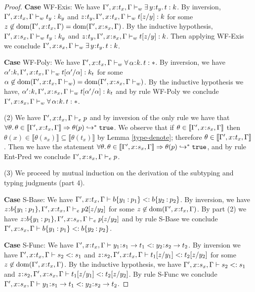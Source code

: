 \documentclass[11pt]{article}
\newcommand{\al}{\alpha}
\newcommand{\bind}{\hspace{0.05em}{:}\hspace{0.05em}} %
\newcommand{\col}{\mathbin{:}}       %
\newcommand{\lb}{\llbracket}         %
\newcommand{\rb}{\rrbracket}         %
\newcommand{\many}{\hookrightarrow^*}
\newcommand{\true}{\mathtt{true}}
\newcommand{\existype}[3]{\exists\, #1\bind #2.\, #3}
\newcommand{\polytype}[3]{\forall\, #1\bind #2.\, #3}
\newcommand{\functype}[3]{#1\bind #2 \rightarrow #3}
\newcommand{\dom}[1]{{\rm dom}(#1)}
\begin{document}
\begin{proof}
{\bf Case} {\sc WF-Exis}: We have $\Gamma', x\bind t_x, \Gamma \vdash_w \existype{y}{t_y}{t} : k$. By inversion, $\Gamma', x\bind t_x, \Gamma \vdash_w t_y : k_y$ and $z\bind t_y, \Gamma', x\bind t_x, \Gamma \vdash_w t[z/y] : k$ for some $z\not\in\dom{\Gamma', x\bind t_x, \Gamma} = \dom{\Gamma', x\bind s_x, \Gamma}$. By the inductive hypothesis, $\Gamma', x\bind s_x, \Gamma \vdash_w t_y : k_y$ and $z\bind t_y, \Gamma', x\bind s_x, \Gamma \vdash_w t[z/y] : k$. Then applying {\sc WF-Exis} we conclude $\Gamma', x\bind s_x, \Gamma \vdash_w \existype{y}{t_y}{t} : k$.

{\bf Case} {\sc WF-Poly}: We have $\Gamma', x\bind t_x, \Gamma \vdash_w \polytype{\al}{k}{t} : *$. By inversion, we have $\al'\bind k,\Gamma', x\bind t_x, \Gamma \vdash_w t[\al'/\al] : k_t$ for some $\al\not\in\dom{\Gamma', x\bind t_x, \Gamma \vdash_w} = \dom{\Gamma', x\bind s_x, \Gamma \vdash_w}$. By the inductive hypothesis we have, $\al'\bind k,\Gamma', x\bind s_x, \Gamma \vdash_wt[\al'/\al] : k_t$ and by rule {\sc WF-Poly} we conclude $\Gamma', x\bind s_x, \Gamma \vdash_w \polytype{\al}{k}{t} : *$.

(2) We have $\Gamma', x\bind t_x, \Gamma \vdash_e p$ and by inversion of the only rule we have that $\forall \theta.\,\theta\in \lb\Gamma', x\bind t_x, \Gamma \rb \Rightarrow  \theta(p) \many \true$. We observe that if $\theta \in \lb\Gamma', x\bind s_x, \Gamma \rb$ then $\theta(x) \in \lb\theta(s_x)\rb \subseteq \lb\theta(t_x)\rb$ by Lemma \ref{type-denote}; therefore $\theta \in \lb\Gamma', x\bind t_x, \Gamma \rb$. Then we have the statement $\forall \theta.\,\theta\in \lb\Gamma', x\bind s_x, \Gamma \rb \Rightarrow  \theta(p) \many \true$, and by rule {\sc Ent-Pred} we conclude $\Gamma', x\bind s_x, \Gamma \vdash_e p$.

(3) We proceed by mutual induction on the derivation of the subtyping and typing judgments (part 4).

{\bf Case} {\sc S-Base}: We have $\Gamma', x\bind t_x, \Gamma \vdash b\{y_1\col p_1\} <: b\{y_2\col p_2\}$. By inversion, we have $z\bind b\{y_1\col p_1\}, \Gamma', x\bind t_x, \Gamma \vdash_e p2[z/y_2]$ for some $z\not\in\dom{\Gamma', x\bind t_x, \Gamma}$. By part (2) we have $z\bind b\{y_1\col p_1\}, \Gamma', x\bind s_x, \Gamma \vdash_e p[z/y_2]$ and by rule {\sc S-Base} we conclude $\Gamma', x\bind s_x, \Gamma \vdash b\{y_1\col p_1\} <: b\{y_2\col p_2\}$.

{\bf Case} {\sc S-Func}: We have $\Gamma', x\bind t_x, \Gamma \vdash \functype{y_1}{s_1}{t_1} <: \functype{y_2}{s_2}{t_2}$. By inversion we have $\Gamma', x\bind t_x, \Gamma \vdash s_2 <: s_1$ and $z\bind s_2, \Gamma', x\bind t_x, \Gamma \vdash t_1[z/y_1] <: t_2[z/y_2]$ for some $z\not\in\dom{\Gamma', x\bind t_x, \Gamma }$. By the inductive hypothesis, we have $\Gamma', x\bind s_x, \Gamma \vdash s_2 <: s_1$ and $z\bind s_2, \Gamma', x\bind s_x, \Gamma \vdash t_1[z/y_1] <: t_2[z/y_2]$. By rule {\sc S-Func} we conclude $\Gamma', x\bind s_x, \Gamma \vdash \functype{y_1}{s_1}{t_1} <: \functype{y_2}{s_2}{t_2}$.


\end{proof}
\end{document}
